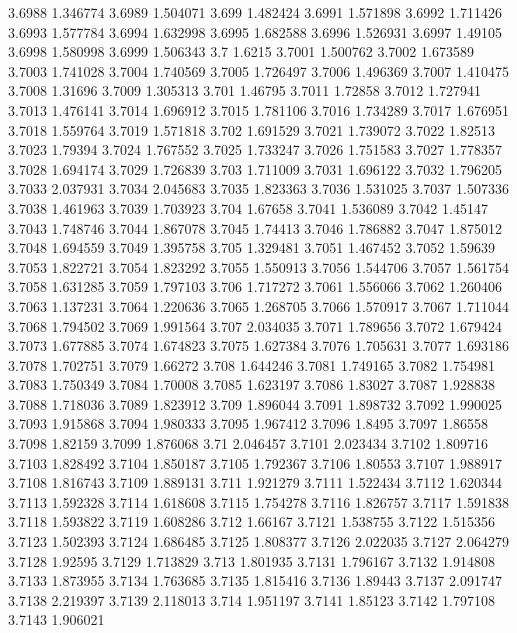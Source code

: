3.6988  1.346774
3.6989  1.504071
3.699  1.482424
3.6991  1.571898
3.6992  1.711426
3.6993  1.577784
3.6994  1.632998
3.6995  1.682588
3.6996  1.526931
3.6997  1.49105
3.6998  1.580998
3.6999  1.506343
3.7  1.6215
3.7001  1.500762
3.7002  1.673589
3.7003  1.741028
3.7004  1.740569
3.7005  1.726497
3.7006  1.496369
3.7007  1.410475
3.7008  1.31696
3.7009  1.305313
3.701  1.46795
3.7011  1.72858
3.7012  1.727941
3.7013  1.476141
3.7014  1.696912
3.7015  1.781106
3.7016  1.734289
3.7017  1.676951
3.7018  1.559764
3.7019  1.571818
3.702  1.691529
3.7021  1.739072
3.7022  1.82513
3.7023  1.79394
3.7024  1.767552
3.7025  1.733247
3.7026  1.751583
3.7027  1.778357
3.7028  1.694174
3.7029  1.726839
3.703  1.711009
3.7031  1.696122
3.7032  1.796205
3.7033  2.037931
3.7034  2.045683
3.7035  1.823363
3.7036  1.531025
3.7037  1.507336
3.7038  1.461963
3.7039  1.703923
3.704  1.67658
3.7041  1.536089
3.7042  1.45147
3.7043  1.748746
3.7044  1.867078
3.7045  1.74413
3.7046  1.786882
3.7047  1.875012
3.7048  1.694559
3.7049  1.395758
3.705  1.329481
3.7051  1.467452
3.7052  1.59639
3.7053  1.822721
3.7054  1.823292
3.7055  1.550913
3.7056  1.544706
3.7057  1.561754
3.7058  1.631285
3.7059  1.797103
3.706  1.717272
3.7061  1.556066
3.7062  1.260406
3.7063  1.137231
3.7064  1.220636
3.7065  1.268705
3.7066  1.570917
3.7067  1.711044
3.7068  1.794502
3.7069  1.991564
3.707  2.034035
3.7071  1.789656
3.7072  1.679424
3.7073  1.677885
3.7074  1.674823
3.7075  1.627384
3.7076  1.705631
3.7077  1.693186
3.7078  1.702751
3.7079  1.66272
3.708  1.644246
3.7081  1.749165
3.7082  1.754981
3.7083  1.750349
3.7084  1.70008
3.7085  1.623197
3.7086  1.83027
3.7087  1.928838
3.7088  1.718036
3.7089  1.823912
3.709  1.896044
3.7091  1.898732
3.7092  1.990025
3.7093  1.915868
3.7094  1.980333
3.7095  1.967412
3.7096  1.8495
3.7097  1.86558
3.7098  1.82159
3.7099  1.876068
3.71  2.046457
3.7101  2.023434
3.7102  1.809716
3.7103  1.828492
3.7104  1.850187
3.7105  1.792367
3.7106  1.80553
3.7107  1.988917
3.7108  1.816743
3.7109  1.889131
3.711  1.921279
3.7111  1.522434
3.7112  1.620344
3.7113  1.592328
3.7114  1.618608
3.7115  1.754278
3.7116  1.826757
3.7117  1.591838
3.7118  1.593822
3.7119  1.608286
3.712  1.66167
3.7121  1.538755
3.7122  1.515356
3.7123  1.502393
3.7124  1.686485
3.7125  1.808377
3.7126  2.022035
3.7127  2.064279
3.7128  1.92595
3.7129  1.713829
3.713  1.801935
3.7131  1.796167
3.7132  1.914808
3.7133  1.873955
3.7134  1.763685
3.7135  1.815416
3.7136  1.89443
3.7137  2.091747
3.7138  2.219397
3.7139  2.118013
3.714  1.951197
3.7141  1.85123
3.7142  1.797108
3.7143  1.906021
